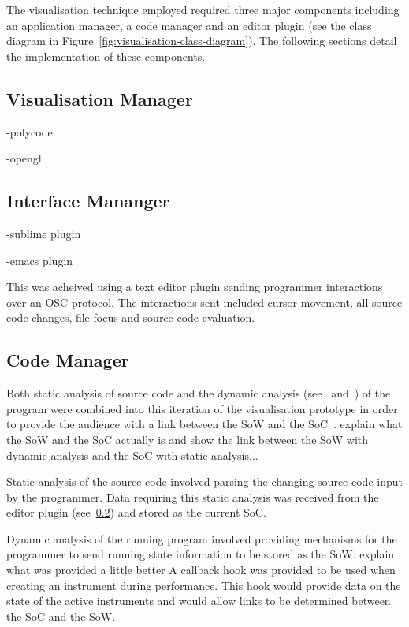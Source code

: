 The visualisation technique employed required three major components including an application manager, a code manager and an editor plugin (see the class diagram in Figure~\ref{fig:visualisation-class-diagram}). The following sections detail the implementation of these components.

\subsection{Visualisation Manager}


-polycode~\cite{Safrin2013}

-opengl

\more

\subsection{Interface Mananger}
\label{sec:interface-manager}

-sublime plugin

-emacs plugin

This was acheived using a text editor plugin sending programmer interactions over an \ac{OSC} protocol. The interactions sent included cursor movement, all source code changes, file focus and source code evaluation.

\more

\subsection{Code Manager}

Both static analysis of source code and the dynamic analysis (see~\cite{Eisenbarth2003} and~\cite{Jerding1997}) of the program were combined into this iteration of the visualisation prototype in order to provide the audience with a link between the \ac{SoW} and the \ac{SoC}~\cite{Swift2013}. {\color{red} explain what the \ac{SoW} and the \ac{SoC} actually is and show the link between the \ac{SoW} with dynamic analysis and the \ac{SoC} with static analysis...}

Static analysis of the source code involved parsing the changing source code input by the programmer. Data requiring this static analysis was received from the editor plugin (see~\ref{sec:interface-manager}) and stored as the current \ac{SoC}.

Dynamic analysis of the running program involved providing mechanisms for the programmer to send running state information to be stored as the \ac{SoW}. {\color{red} explain what was provided a little better} A callback hook was provided to be used when creating an instrument during performance. This hook would provide data on the state of the active instruments and would allow links to be determined between the \ac{SoC} and the \ac{SoW}.

